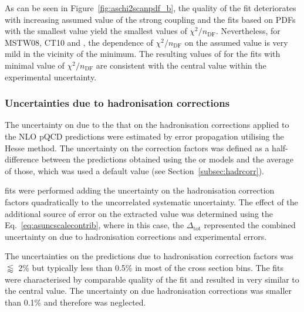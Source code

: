 As can be seen in Figure~\ref{fig:aschi2scanpdf_b}, the quality of the fit deteriorates with increasing assumed value of the strong coupling and the fits based on PDFs with the smallest \asz value yield the smallest values of $\chi^2/n_\text{DF}$. Nevertheless, for MSTW08, CT10 and , the dependence of $\chi^2/n_\text{DF}$ on the assumed value is very mild in the vicinity of the minimum. The resulting values of \as for the fits with minimal value of $\chi^2/n_\text{DF}$ are consistent with the central value within the experimental uncertainty.

\subsubsection{Uncertainties due to hadronisation corrections}
\label{subsec:ashadrunc}
The uncertainty on \as due to the that on the hadronisation corrections applied to the NLO pQCD predictions were estimated by error propagation utilising the Hesse method. The uncertainty on the correction factors was defined as a half-difference between the predictions obtained using the \ariadne or \lepto models and the average of those, which was used a default value (see Section~\ref{subsec:hadrcorr}).

\as fits were performed adding the uncertainty on the hadronisation correction factors quadratically to the uncorrelated systematic uncertainty. The effect of the additional source of error on the extracted \asz value was determined using the Eq.~\eqref{eq:asuncscalecontrib}, where in this case, the $\Delta_\text{tot}$ represented the combined uncertainty on \as due to hadronisation corrections and experimental errors.

The uncertainties on the predictions due to hadronisation correction factors was $\lessapprox$ 2\% but typically less than 0.5\% in most of the cross section bins. The \as fits were characterised by comparable quality of the fit and resulted in \asz very similar to the central value. The uncertainty on \asz due hadronisation corrections was smaller than 0.1\% and therefore was neglected.